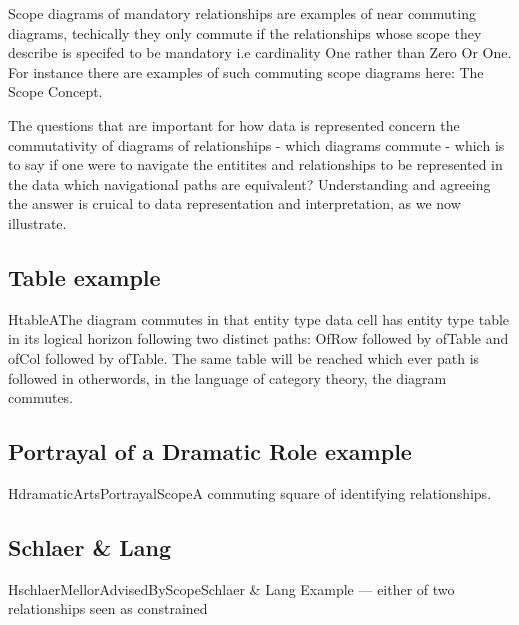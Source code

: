 Scope diagrams of mandatory relationships are examples of near commuting diagrams, techically they only commute if the relationships whose scope they describe is specifed to be mandatory i.e cardinality One rather than Zero Or One. For instance there are examples of such commuting scope diagrams here: The Scope Concept.

The questions that are important for how data is represented concern the commutativity of diagrams of relationships - which diagrams commute - which is to say if one were to navigate the entitites and relationships to be represented in the data which navigational paths are equivalent? Understanding and agreeing the answer is cruical to data representation and interpretation, as we now illustrate.

\subsection{Table example}
\begin{erboxedFigure}{H}{tableA}{The diagram commutes in that entity type data cell has entity type table in its logical horizon following two distinct paths: OfRow followed by ofTable and ofCol followed by ofTable. The same table will be reached which ever path is followed in otherwords, in the language of category theory, the diagram commutes.}

\end{erboxedFigure}

\subsection{Portrayal of a Dramatic Role example}
\begin{erboxedFigure}{H}{dramaticArtsPortrayalScope}{A commuting square of identifying relationships.}

\end{erboxedFigure}

\subsection{Schlaer & Lang}
\begin{erboxedFigure}{H}{schlaerMellorAdvisedByScope}{Schlaer & Lang Example --- either of two relationships seen as constrained}

\end{erboxedFigure}